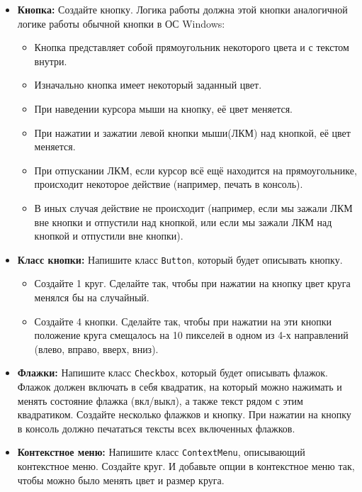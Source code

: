 \documentclass{article}
\begin{document}
\begin{itemize}
\item \textbf{Кнопка:} Создайте кнопку. Логика работы должна этой кнопки аналогичной логике работы обычной кнопки в ОС Windows:
\begin{itemize}
\item Кнопка представляет собой прямоугольник некоторого цвета и с текстом внутри.
\item Изначально кнопка имеет некоторый заданный цвет.
\item При наведении курсора мыши на кнопку, её цвет меняется.
\item При нажатии и зажатии левой кнопки мыши(ЛКМ) над кнопкой, её цвет меняется.
\item При отпускании ЛКМ, если курсор всё ещё находится на прямоугольнике, происходит некоторое действие (например, печать в консоль).
\item В иных случая действие не происходит (например, если мы зажали ЛКМ вне кнопки и отпустили над кнопкой, или если мы зажали ЛКМ над кнопкой и отпустили вне кнопки).
\end{itemize}

\item \textbf{Класс кнопки:}  Напишите класс \texttt{Button}, который будет описывать кнопку. 
\begin{itemize}
\item Создайте 1 круг. Сделайте так, чтобы при нажатии на кнопку цвет круга менялся бы на случайный.
\item Создайте 4 кнопки. Сделайте так, чтобы при нажатии на эти кнопки положение круга смещалось на 10 пикселей в одном из 4-х направлений (влево, вправо, вверх, вниз).
\end{itemize}
	
\item \textbf{Флажки:} Напишите класс \texttt{Checkbox}, который будет описывать флажок. Флажок должен включать в себя квадратик, на который можно нажимать и менять состояние флажка (вкл/выкл), а также текст рядом с этим квадратиком. Создайте несколько флажков и кнопку. При нажатии на кнопку в консоль должно печататься тексты всех включенных флажков.

\item \textbf{Контекстное меню:} Напишите класс \texttt{ContextMenu}, описывающий контекстное меню.
Создайте круг. И добавьте опции в контекстное меню так, чтобы можно было менять цвет и размер круга.
\end{itemize}
\end{document}
